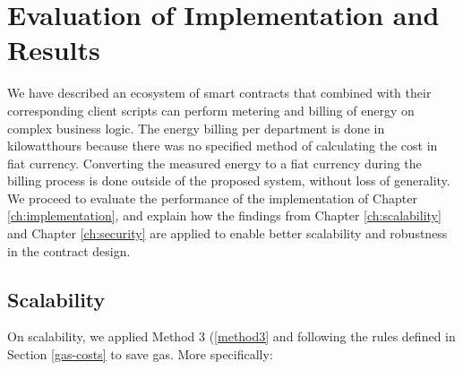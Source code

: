\chapter{Evaluation of Implementation and Results}\label{ch:results}

We have described an ecosystem of smart contracts that combined with their corresponding client scripts can perform metering and billing of energy on complex business logic. The energy billing per department is done in kilowatthours because there was no specified method of calculating the cost in fiat currency. Converting the measured energy to a fiat currency during the billing process is done outside of the proposed system, without loss of generality. We proceed to evaluate the performance of the implementation of Chapter \ref{ch:implementation}, and explain how the findings from Chapter \ref{ch:scalability} and Chapter \ref{ch:security} are applied to enable better scalability and robustness in the contract design.

\section{Scalability}
On scalability, we applied Method 3 (\ref{method3} and following the rules defined in Section \ref{gas-costs} to save gas. More specifically:

